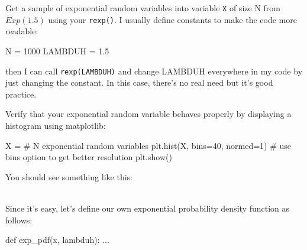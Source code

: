 \begin{fullwidth}
\step Get a sample of exponential random variables into variable {\tt X} of size N from $Exp(1.5)$ using your {\tt rexp()}. I usually define constants to make the code more readable:

\begin{pyverbatim}
N = 1000
LAMBDUH = 1.5
\end{pyverbatim}

\noindent then I can call {\tt rexp(LAMBDUH)} and change LAMBDUH everywhere in my code by just changing the constant. In this case, there's no real need but it's good practice.

\step Verify that your exponential random variable behaves properly by displaying a histogram using matplotlib:

\begin{pyverbatim}
X = # N exponential random variables
plt.hist(X, bins=40, normed=1) # use bins option to get better resolution
plt.show()
\end{pyverbatim}

\noindent You should see something like this:


\\

\step Since it's easy, let's define our own exponential probability density function as follows:

\begin{pyverbatim}
def exp_pdf(x, lambduh):
    ...
\end{pyverbatim}


\end{fullwidth}
